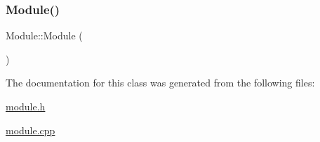 \subsubsection{\texorpdfstring{Module()}{Module()}}
{\footnotesize\ttfamily Module\+::\+Module (\begin{DoxyParamCaption}{ }\end{DoxyParamCaption})}



The documentation for this class was generated from the following files\+:\begin{DoxyCompactItemize}
\item 
\mbox{\hyperlink{module_8h}{module.\+h}}\item 
\mbox{\hyperlink{module_8cpp}{module.\+cpp}}\end{DoxyCompactItemize}
